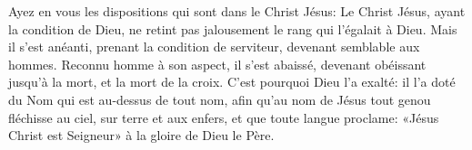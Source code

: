 Ayez en vous les dispositions qui sont dans le Christ Jésus:
	Le Christ Jésus, ayant la condition de Dieu,
	ne retint pas jalousement le rang qui l’égalait à Dieu.
Mais il s’est anéanti, prenant la condition de serviteur, devenant semblable aux hommes.
Reconnu homme à son aspect, il s’est abaissé,
	devenant obéissant jusqu’à la mort, et la mort de la croix.
C’est pourquoi Dieu l’a exalté: il l’a doté du Nom qui est au-dessus de tout nom,
	afin qu’au nom de Jésus tout genou fléchisse au ciel, sur terre et aux enfers,
	et que toute langue proclame:
	«Jésus Christ est Seigneur» à la gloire de Dieu le Père.
